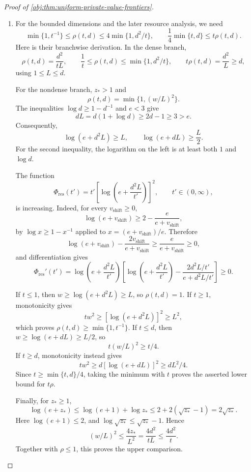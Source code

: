 \begin{proof}[Proof of \cref{obj:thm:uniform-private-value-frontiers}]
\begin{enumerate}
\item
For the bounded dimensions and the later resource analysis, we need
\[
\min\{1,t^{-1}\}\le\rho(t,d)
\le4\min\{1,d^2/t\},
\qquad
\frac14\min\{t,d\}\le t\rho(t,d).
\]
Here is their branchwise derivation. In the dense branch,
\[
\rho(t,d)=\frac{d^2}{tL},
\qquad
\frac1t\le\rho(t,d)\le\min\{1,d^2/t\},
\qquad
t\rho(t,d)=\frac{d^2}{L}\ge d,
\]
using \(1\le L\le d\).

For the nondense branch, \(z_*>1\) and
\[
\rho(t,d)=\min\{1,(w/L)^2\}.
\]
The inequalities \(\log d\ge1-d^{-1}\) and \(e<3\) give
\[
dL=d(1+\log d)\ge2d-1\ge3>e.
\]
Consequently,
\[
\log(e+d^2L)\ge L,
\qquad
\log(e+dL)\ge\frac L2.
\]
For the second inequality, the logarithm on the left is at least both
\(1\) and \(\log d\).

The function
\[
\Phi_{\mathrm{res}}(t')
=t'\left[\log\left(e+\frac{d^2L}{t'}\right)\right]^2,
\qquad t'\in(0,\infty),
\]
is increasing. Indeed, for every \(v_{\mathrm{shift}}\ge0\),
\[
\log(e+v_{\mathrm{shift}})
\ge2-\frac e{e+v_{\mathrm{shift}}},
\]
by \(\log x\ge1-x^{-1}\) applied to
\(x=(e+v_{\mathrm{shift}})/e\). Therefore
\[
\log(e+v_{\mathrm{shift}})
-\frac{2v_{\mathrm{shift}}}{e+v_{\mathrm{shift}}}
\ge\frac e{e+v_{\mathrm{shift}}}\ge0,
\]
and differentiation gives
\[
\Phi_{\mathrm{res}}'(t')
=
\log\left(e+\frac{d^2L}{t'}\right)
\left[
\log\left(e+\frac{d^2L}{t'}\right)
-\frac{2d^2L/t'}{e+d^2L/t'}
\right]\ge0.
\]

If \(t\le1\), then \(w\ge\log(e+d^2L)\ge L\), so \(\rho(t,d)=1\).
If \(t\ge1\), monotonicity gives
\[
tw^2\ge[\log(e+d^2L)]^2\ge L^2,
\]
which proves \(\rho(t,d)\ge\min\{1,t^{-1}\}\).
If \(t\le d\), then \(w\ge\log(e+dL)\ge L/2\), so
\[
t(w/L)^2\ge t/4.
\]
If \(t\ge d\), monotonicity instead gives
\[
tw^2\ge d[\log(e+dL)]^2\ge dL^2/4.
\]
Since \(t\ge\min\{t,d\}/4\), taking the minimum with \(t\) proves the asserted lower bound for \(t\rho\).

Finally, for \(z_*\ge1\),
\[
\log(e+z_*)
\le\log(e+1)+\log z_*
\le2+2(\sqrt{z_*}-1)=2\sqrt{z_*}.
\]
Here \(\log(e+1)\le2\), and
\(\log\sqrt{z_*}\le\sqrt{z_*}-1\).
Hence
\[
(w/L)^2\le\frac{4z_*}{L^2}
=\frac{4d^2}{tL}\le\frac{4d^2}{t}.
\]
Together with \(\rho\le1\), this proves the upper comparison.


\end{enumerate}
\end{proof}
